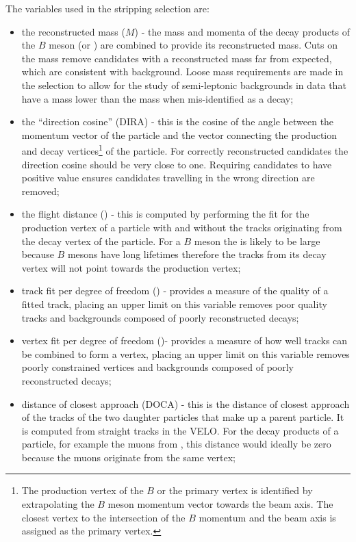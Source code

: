 The variables used in the stripping selection are:
\begin{itemize}
\item the reconstructed mass ($M$) - the mass and momenta of the decay products of the $B$ meson (or \jpsi) are combined to provide its reconstructed mass. Cuts on the mass remove candidates with a reconstructed mass far from expected, which are consistent with background. Loose mass requirements are made in the \bmumu selection to allow for the study of semi-leptonic backgrounds in data that have a mass lower than the \bsd mass when mis-identified as a \bmumu decay;
\item the ``direction cosine'' (DIRA) - this is the cosine of the angle between the momentum vector of the particle and the vector connecting the production and decay vertices\footnote{The production vertex of the $B$ or the primary vertex is identified by extrapolating the $B$ meson momentum vector towards the beam axis. The closest vertex to the intersection of the $B$ momentum and the beam axis is assigned as the primary vertex.} of the particle. For correctly reconstructed candidates the direction cosine should be very close to one. Requiring candidates to have positive value ensures candidates travelling in the wrong direction are removed;
\item the flight distance \chisqd (\chiFD) - this is computed by performing the fit for the production vertex of a particle with and without the tracks originating from the decay vertex of the particle. For a $B$ meson the \chiFD is likely to be large because $B$ mesons have long lifetimes therefore the tracks from its decay vertex will not point towards the production vertex;
\item track fit \chisqd per degree of freedom (\chitrk) - provides a measure of the quality of a fitted track, placing an upper limit on this variable removes poor quality tracks and backgrounds composed of poorly reconstructed decays;
\item vertex fit \chisqd per degree of freedom  (\chivtx)- provides a measure of how well tracks can be combined to form a vertex, placing an upper limit on this variable removes poorly constrained vertices and backgrounds composed of poorly reconstructed decays;
\item distance of closest approach (DOCA) - this is the distance of closest approach of the tracks of the two daughter particles that make up a parent particle. It is computed from straight tracks in the VELO. For the decay products of a particle, for example the muons from \bmumu, this distance would ideally be zero because the muons originate from the same vertex;

\end{itemize}
